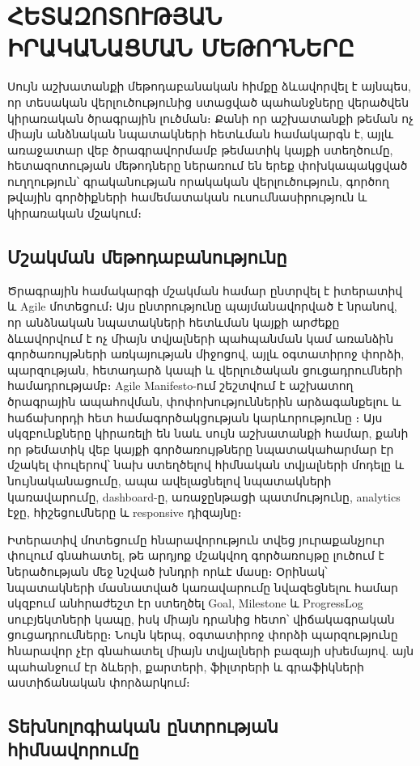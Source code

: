 \chapter{ՀԵՏԱԶՈՏՈՒԹՅԱՆ ԻՐԱԿԱՆԱՑՄԱՆ ՄԵԹՈԴՆԵՐԸ}
\sloppy

Սույն աշխատանքի մեթոդաբանական հիմքը ձևավորվել է այնպես, որ տեսական վերլուծությունից ստացված պահանջները վերածվեն կիրառական ծրագրային լուծման։ Քանի որ աշխատանքի թեման ոչ միայն անձնական նպատակների հետևման համակարգն է, այլև առաջատար վեբ ծրագրավորմամբ թեմատիկ կայքի ստեղծումը, հետազոտության մեթոդները ներառում են երեք փոխկապակցված ուղղություն՝ գրականության որակական վերլուծություն, գործող թվային գործիքների համեմատական ուսումնասիրություն և կիրառական մշակում։

\section{Մշակման մեթոդաբանությունը}

Ծրագրային համակարգի մշակման համար ընտրվել է իտերատիվ և Agile մոտեցում։ Այս ընտրությունը պայմանավորված է նրանով, որ անձնական նպատակների հետևման կայքի արժեքը ձևավորվում է ոչ միայն տվյալների պահպանման կամ առանձին գործառույթների առկայության միջոցով, այլև օգտատիրոջ փորձի, պարզության, հետադարձ կապի և վերլուծական ցուցադրումների համադրությամբ։ Agile Manifesto-ում շեշտվում է աշխատող ծրագրային ապահովման, փոփոխություններին արձագանքելու և հաճախորդի հետ համագործակցության կարևորությունը \autocite{beck2001agile}։ Այս սկզբունքները կիրառելի են նաև սույն աշխատանքի համար, քանի որ թեմատիկ վեբ կայքի գործառույթները նպատակահարմար էր մշակել փուլերով՝ նախ ստեղծելով հիմնական տվյալների մոդելը և նույնականացումը, ապա ավելացնելով նպատակների կառավարումը, dashboard-ը, առաջընթացի պատմությունը, analytics էջը, հիշեցումները և responsive դիզայնը։

Իտերատիվ մոտեցումը հնարավորություն տվեց յուրաքանչյուր փուլում գնահատել, թե արդյոք մշակվող գործառույթը լուծում է ներածության մեջ նշված խնդրի որևէ մասը։ Օրինակ՝ նպատակների մասնատված կառավարումը նվազեցնելու համար սկզբում անհրաժեշտ էր ստեղծել Goal, Milestone և ProgressLog սուբյեկտների կապը, իսկ միայն դրանից հետո՝ վիճակագրական ցուցադրումները։ Նույն կերպ, օգտատիրոջ փորձի պարզությունը հնարավոր չէր գնահատել միայն տվյալների բազայի սխեմայով. այն պահանջում էր ձևերի, քարտերի, ֆիլտրերի և գրաֆիկների աստիճանական փորձարկում։

\section{Տեխնոլոգիական ընտրության հիմնավորումը}

